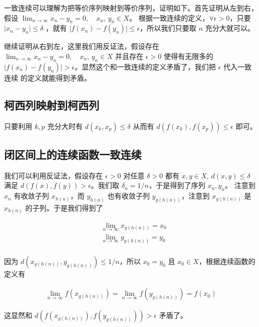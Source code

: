 一致连续可以理解为把等价序列映射到等价序列，证明如下。首先证明从左到右，假设 $\lim_{n \to \infty} x_n -y_n = 0,\quad x_n,\, y_n \in X$。
根据一致连续的定义，$\forall \epsilon >0$，只要 $\lvert x_n - y_n \rvert \le \delta$ ，就有 $\lvert f(x_n) - f(y_n)\rvert \le \epsilon $，所以我们只要取 $n$ 充分大就可以。

继续证明从右到左，这里我们用反证法，假设存在 $\lim_{n \to \infty} x_n -y_n = 0,\quad x_n,\, y_n \in X$ 并且存在 $\epsilon > 0$ 使得有无限多的 $\lvert f(x_n) - f(y_n)\rvert > \epsilon$。显然这个和一致连续的定义矛盾了，我们把 $\epsilon$ 代入一致连续
的定义就能得到矛盾。


\subsection{柯西列映射到柯西列}

只要利用 $k,p$ 充分大时有 $d(x_k, x_p) \le \delta$ 从而有 $d(f(x_k),f(x_p)) \le \epsilon$ 即可。


\subsection{闭区间上的连续函数一致连续}

我们可以利用反证法，假设存在 $\epsilon > 0$ 对任意 $\delta > 0$ 都有 $x,y \in X,\, d(x,y) \le \delta$ 满足 $d(f(x), f(y)) > \epsilon$。我们取 $\delta_n = 1/n$，于是得到了序列 $x_n ,y_n$。
注意到 $x_n$ 有收敛子列 $x_{h(n)}$，而 $ y_{h(n)}$ 也有收敛子列 $y_{g(h(n))}$，注意到 $x_{g(h(n))}$ 是 $x_{h(n)}$ 的子列。于是我们得到了

\begin{align*}
    & \lim_{n \to \infty}x_{g(h(n))} = x_0 \\
    & \lim_{n \to \infty}y_{g(h(n))} = y_0 \\
\end{align*}

因为 $d(x_{g(h(n))}, y_{g(h(n))}) \le 1/n$，所以 $x_0 = y_0$ 且 $x_0 \in X$，根据连续函数的定义有


\begin{align*}
     \lim_{n \to \infty}f(x_{g(h(n))}) = \lim_{n \to \infty}f(y_{g(h(n))}) = f(x_0)
\end{align*}

这显然和 $d(f(x_{g(h(n))}), f(y_{g(h(n))})) > \epsilon$ 矛盾了。